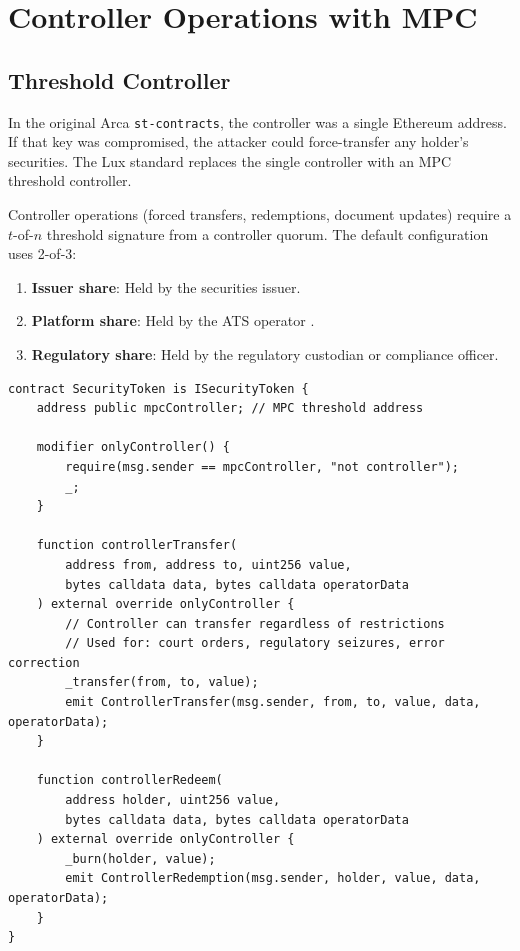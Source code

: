 \section{Controller Operations with MPC}
\label{sec:controller}

\subsection{Threshold Controller}

In the original Arca \texttt{st-contracts}, the controller was a single Ethereum address. If that key was compromised, the attacker could force-transfer any holder's securities. The Lux standard replaces the single controller with an MPC threshold controller.

Controller operations (forced transfers, redemptions, document updates) require a $t$-of-$n$ threshold signature from a controller quorum. The default configuration uses 2-of-3:

\begin{enumerate}[nosep]
  \item \textbf{Issuer share}: Held by the securities issuer.
  \item \textbf{Platform share}: Held by the ATS operator \cite{lux-ats-architecture}.
  \item \textbf{Regulatory share}: Held by the regulatory custodian or compliance officer.
\end{enumerate}

\begin{lstlisting}[language=Solidity,caption={MPC-controlled forced transfer.}]
contract SecurityToken is ISecurityToken {
    address public mpcController; // MPC threshold address

    modifier onlyController() {
        require(msg.sender == mpcController, "not controller");
        _;
    }

    function controllerTransfer(
        address from, address to, uint256 value,
        bytes calldata data, bytes calldata operatorData
    ) external override onlyController {
        // Controller can transfer regardless of restrictions
        // Used for: court orders, regulatory seizures, error correction
        _transfer(from, to, value);
        emit ControllerTransfer(msg.sender, from, to, value, data, operatorData);
    }

    function controllerRedeem(
        address holder, uint256 value,
        bytes calldata data, bytes calldata operatorData
    ) external override onlyController {
        _burn(holder, value);
        emit ControllerRedemption(msg.sender, holder, value, data, operatorData);
    }
}
\end{lstlisting}

